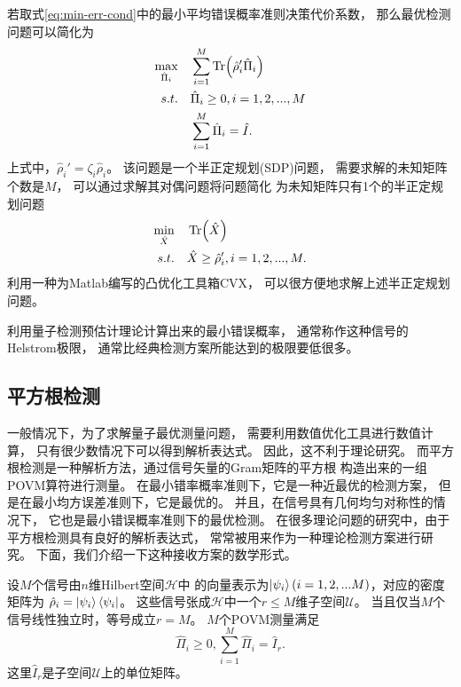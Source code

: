 若取式\ref{eq:min-err-cond}中的最小平均错误概率准则决策代价系数，
那么最优检测问题可以简化为
\begin{equation}
\begin{split}
\max_{\hat{\Pi}_i}  \quad  &  \sum_{i=1}^M \Tr(\hat{\rho}_i'\hat{\Pi}_i) \\
s.t. \quad  & \hat{\Pi}_i \ge 0, i=1,2,...,M   \\
     \quad  & \sum_{i=1}^M \hat{\Pi}_i = \hat{I}.
\end{split}
\end{equation}
上式中，$\hat{\rho}_i' = \zeta_i \hat{\rho}_i$。
该问题是一个半正定规划(SDP)问题，
需要求解的未知矩阵个数是$M$，
可以通过求解其对偶问题将问题简化
为未知矩阵只有1个的半正定规划问题\cite{eldar2003designing}
\begin{equation}
\begin{split}
\min_{\hat{X}}  \quad & \Tr(\hat{X}) \\
s.t.          \quad & \hat{X} \ge \hat{\rho}_i', i=1,2,...,M.
\label{eq:Hel-SDP}
\end{split}
\end{equation}
利用一种为Matlab编写的凸优化工具箱CVX，
可以很方便地求解上述半正定规划问题\cite{cvx,gb08}。

利用量子检测预估计理论计算出来的最小错误概率，
通常称作这种信号的Helstrom极限，
通常比经典检测方案所能达到的极限要低很多\cite{helstrom1976quantum}。



\subsection{平方根检测}
一般情况下，为了求解量子最优测量问题，
需要利用数值优化工具进行数值计算，
只有很少数情况下可以得到解析表达式。
因此，这不利于理论研究。
而平方根检测是一种解析方法，通过信号矢量的Gram矩阵的平方根
构造出来的一组POVM算符进行测量\cite{hausladen1994pretty,hausladen1996classical}。
在最小错率概率准则下，它是一种近最优的检测方案，
但是在最小均方误差准则下，它是最优的。
并且，在信号具有几何均匀对称性的情况下，
它也是最小错误概率准则下的最优检测\cite{kato1999quantum,eldar2001quantum,cariolaro2010performance,cariolaro2010theory}。
在很多理论问题的研究中，由于平方根检测具有良好的解析表达式，
常常被用来作为一种理论检测方案进行研究\cite{hausladen1996classical,sasaki1998quantum,guha2012polar}。
下面，我们介绍一下这种接收方案的数学形式。

设$M$个信号由$n$维Hilbert空间$\mathcal{H}$中
的向量表示为$\ket{\psi_i}(i=1,2,...M)$，对应的密度矩阵为
$\hat{\rho}_i = \ket{\psi_i} \bra{\psi_i}$。
这些信号张成$\mathcal{H}$中一个$r\le M$维子空间$\mathcal{U}$。
当且仅当$M$个信号线性独立时，等号成立$r=M$。
$M$个POVM测量满足
\begin{equation}
\hat{\Pi}_i \ge 0, \sum_{i=1}^M \hat{\Pi}_i = \hat{I}_r.
\end{equation}
这里$\hat{I}_r$是子空间$\mathcal{U}$上的单位矩阵。

